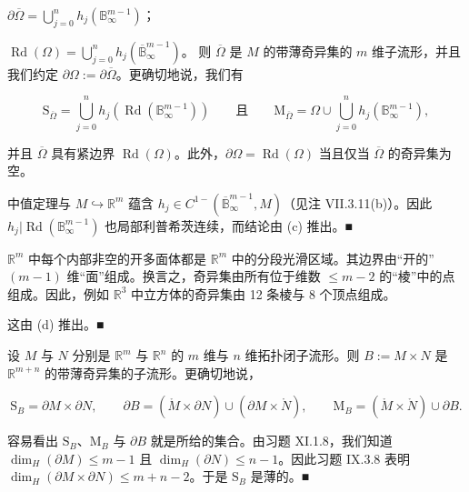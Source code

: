 \begin{example}
\begin{items}
\begin{subitems}
\item

$ \partial\overline{\Omega} = \bigcup_{j=0}^{n} h_j(\mathbb{B}_\infty^{m-1}) $；

\item

$ \operatorname{Rd}(\Omega) = \bigcup_{j=0}^{n} h_j(\overline{\mathbb{B}}_\infty^{m-1}) $。
则 $ \overline{\Omega} $ 是 $ M $ 的带薄奇异集的 $ m $ 维子流形，并且我们约定 $ \partial\Omega := \partial\overline{\Omega} $。更确切地说，我们有

\[
\mathrm{S}_{\overline{\Omega}} = \bigcup_{j=0}^{n} h_j(\operatorname{Rd}(\mathbb{B}_\infty^{m-1})) \qquad \text{且} \qquad \mathrm{M}_{\overline{\Omega}} = \Omega \cup \bigcup_{j=0}^{n} h_j(\mathbb{B}_\infty^{m-1}),
\]

并且 $ \overline{\Omega} $ 具有紧边界 $ \operatorname{Rd}(\Omega) $。此外，$ \partial\Omega = \operatorname{Rd}(\Omega) $ 当且仅当 $ \overline{\Omega} $ 的奇异集为空。

\proofhead
中值定理与 $ M \hookrightarrow \mathbb{R}^m $ 蕴含 $ h_j \in C^{1-}(\overline{\mathbb{B}}_\infty^{m-1}, M) $（见注 VII.3.11(b)）。因此 $ h_j|\operatorname{Rd}(\mathbb{B}_\infty^{m-1}) $ 也局部利普希茨连续，而结论由 (c) 推出。\nobreak\hspace{0.35em}■
\end{subitems}

\item[（e）]

$ \mathbb{R}^m $ 中每个内部非空的开多面体都是 $ \mathbb{R}^m $ 中的分段光滑区域。其边界由“开的”$ (m-1) $ 维“面”组成。换言之，奇异集由所有位于维数 $ \le m-2 $ 的“棱”中的点组成。因此，例如 $ \mathbb{R}^3 $ 中立方体的奇异集由 12 条棱与 8 个顶点组成。

\proofhead
这由 (d) 推出。\nobreak\hspace{0.35em}■
\item[（f）]

设 $ M $ 与 $ N $ 分别是 $ \mathbb{R}^m $ 与 $ \mathbb{R}^n $ 的 $ m $ 维与 $ n $ 维拓扑闭子流形。则 $ B := M \times N $ 是 $ \mathbb{R}^{m+n} $ 的带薄奇异集的子流形。更确切地说，

\[
\mathrm{S}_B = \partial M \times \partial N, \qquad \partial B = (\mathring{M} \times \partial N) \cup (\partial M \times \mathring{N}), \qquad \mathrm{M}_B = (\mathring{M} \times \mathring{N}) \cup \partial B.
\]

\proofhead
容易看出 $ \mathrm{S}_B $、$ \mathrm{M}_B $ 与 $ \partial B $ 就是所给的集合。由习题 XI.1.8，我们知道 $ \dim_H(\partial M) \le m-1 $ 且 $ \dim_H(\partial N) \le n-1 $。因此习题 IX.3.8 表明 $ \dim_H(\partial M \times \partial N) \le m+n-2 $。于是 $ \mathrm{S}_B $ 是薄的。\nobreak\hspace{0.35em}■
\item[（g）]


\end{items}
\end{example}

